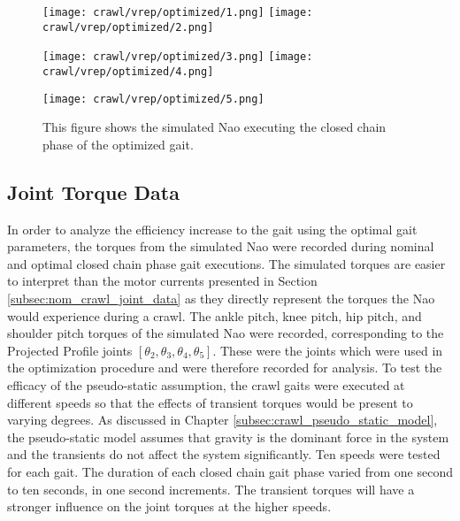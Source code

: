 \begin{figure}
  \centerline{
    \texttt{[image: crawl/vrep/optimized/1.png]}
    \texttt{[image: crawl/vrep/optimized/2.png]}
  }
  \centerline{
    \texttt{[image: crawl/vrep/optimized/3.png]}
    \texttt{[image: crawl/vrep/optimized/4.png]}
  }
  \centerline{
    \texttt{[image: crawl/vrep/optimized/5.png]}
  }
  \caption{This figure shows the simulated Nao executing the closed chain phase of the
           optimized gait.}
  \label{fig:vrep_nao_opt_gait1}
\end{figure}

\subsection{Joint Torque Data} \label{subsec:opt_joint_torque_data}

In order to analyze the efficiency increase to the gait using the optimal gait parameters,
the torques from the simulated Nao were recorded during nominal and optimal closed chain
phase gait executions. The simulated torques are easier to interpret than the motor currents
presented in Section \ref{subsec:nom_crawl_joint_data} as they directly represent the torques
the Nao would experience during a crawl. The ankle pitch, knee pitch, hip pitch, and shoulder pitch
torques of the simulated Nao were recorded, corresponding to the Projected Profile joints 
$[\theta_2, \theta_3, \theta_4, \theta_5]$. These were the joints which were used in the optimization
procedure and were therefore recorded for analysis.
To test the efficacy of the pseudo-static assumption, the crawl gaits were executed at different
speeds so that the effects of transient torques would be present to varying degrees.
As discussed in Chapter \ref{subsec:crawl_pseudo_static_model}, the pseudo-static
model assumes that gravity is the dominant force in the system and the  transients
do not affect the system significantly.
Ten speeds were tested for each gait. The duration of each closed chain gait phase varied from one second to
ten seconds, in one second increments. The transient torques will have a stronger influence
on the joint torques at the higher speeds.

